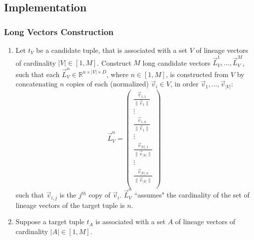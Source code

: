 \subsection{Implementation}

\subsubsection{Long Vectors Construction}
\begin{enumerate}

    \item Let $t_V$ be a candidate tuple, that is associated with a set $V$ of lineage vectors of cardinality $|V| \in [1, M]$. Construct $M$ long candidate vectors $\vec{L}_V^1, ..., \vec{L}_V^M$, such that each $\vec{L}_V^n \in \mathbb{R}^{n \times |V| \times D}$, where $n \in [1, M]$, is constructed from $V$ by concatenating $n$ copies of each (normalized) $\vec{v}_i \in V$, in order $\vec{v}_1, ..., \vec{v}_{|V|}$: \\
    \begin{equation*}
        \vec{L}_V^n = \begin{pmatrix}
                    \frac{\vec{v}_{1, 1}}{\lVert \vec{v}_1 \rVert}\\ 
                    \vdots\\ 
                    \frac{\vec{v}_{1, n}}{\lVert \vec{v}_1 \rVert}\\ 
                   \vdots\\ 
                   \frac{\vec{v}_{|V|, 1}}{\lVert \vec{v}_{|V|} \rVert}\\ 
                   \vdots\\ 
                   \frac{\vec{v}_{|V|, n}}{\lVert \vec{v}_{|V|} \rVert}\\
                   \end{pmatrix}
                   \end{equation*}
        such that $\vec{v}_{i, j}$ is the $j^{th}$ copy of $\vec{v}_i$.
        $\vec{L}_V^n$ ``assumes" the cardinality of the set of lineage vectors of the target tuple is $n$.
        
    \item Suppose a target tuple $t_A$ is associated with a set $A$ of lineage vectors of cardinality $|A| \in [1, M]$.


\end{enumerate}
